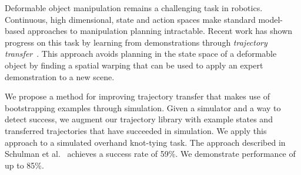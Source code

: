 Deformable object manipulation remains a challenging task in robotics.
Continuous, high dimensional, state and action spaces make standard
model-based approaches to manipulation planning intractable. Recent work
has shown progress on this task by learning from
demonstrations through 
\emph{trajectory transfer}~\cite{Schulmanetal_ISRR2013, Schulmanetal_IROS2013}. This approach avoids planning in the state space of a deformable object
by finding a spatial warping that can be used to apply an expert demonstration
to a new scene.

We propose a method for improving trajectory transfer that makes use of bootstrapping examples through simulation. Given a simulator and a way to detect success, we augment our trajectory library with example states and transferred trajectories that have succeeded in simulation. We apply this approach to a simulated overhand knot-tying task. The approach described in Schulman et al.~\cite{Schulmanetal_ISRR2013} achieves a success rate of 59\%. We demonstrate performance of up to 85\%. 

